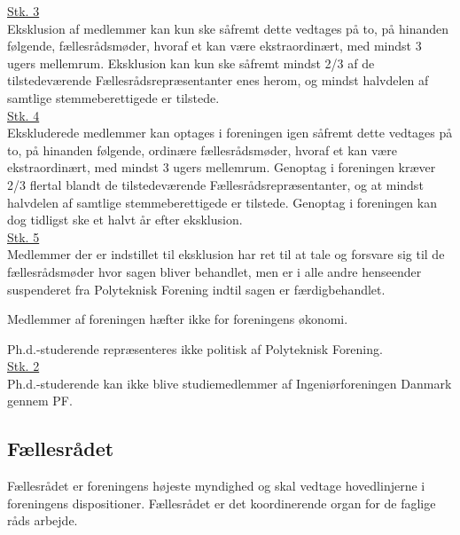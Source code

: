 \begin{list}
\underline{Stk. 3}\\
Eksklusion af medlemmer kan kun ske såfremt dette vedtages på to, på hinanden følgende, fællesrådsmøder, hvoraf et kan være ekstraordinært, med mindst 3 ugers mellemrum. Eksklusion kan kun ske såfremt mindst 2/3 af de tilstedeværende Fællesrådsrepræsentanter enes herom, og mindst halvdelen af
samtlige stemmeberettigede er tilstede.\\

\underline{Stk. 4}\\
Ekskluderede medlemmer kan optages i foreningen igen såfremt dette vedtages på to, på hinanden følgende, ordinære fællesrådsmøder, hvoraf et kan være ekstraordinært, med mindst 3 ugers mellemrum. Genoptag i foreningen kræver 2/3 flertal blandt de tilstedeværende Fællesrådsrepræsentanter, og at mindst halvdelen af samtlige stemmeberettigede er tilstede. Genoptag i foreningen kan dog tidligst ske et halvt år efter eksklusion.\\

\underline{Stk. 5}\\
Medlemmer der er indstillet til eksklusion har ret til at tale og forsvare sig til de fællesrådsmøder hvor sagen bliver behandlet, men er i alle andre henseender suspenderet fra Polyteknisk Forening indtil sagen er færdigbehandlet.
\item Medlemmer af foreningen hæfter ikke for foreningens økonomi.
\item \label{L:medlem:PHD} Ph.d.-studerende repræsenteres ikke politisk af Polyteknisk Forening.\\

\underline{Stk. 2}\\
Ph.d.-studerende kan ikke blive studiemedlemmer af Ingeniørforeningen Danmark gennem PF.


\subsection{Fællesrådet}
\label{L:kap:faellesraadet}
\item Fællesrådet er foreningens højeste myndighed og skal vedtage hovedlinjerne i foreningens dispositioner. Fællesrådet er det koordinerende organ for de faglige råds arbejde.


\end{list}
